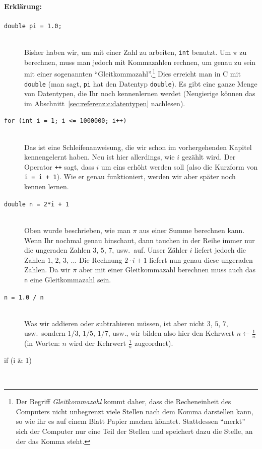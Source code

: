 \paragraph{Erklärung:}

\begin{description}
  \item[\texttt{double pi = 1.0;}] \hfill\\
    Bisher haben wir, um mit einer Zahl zu arbeiten, \texttt{int} benutzt. Um $\pi$ zu berechnen, muss man jedoch mit Kommazahlen rechnen, um genau zu sein mit einer sogenannten ``Gleitkommazahl''.\footnote{%
      Der Begriff \emph{Gleitkommazahl} kommt daher, dass die Recheneinheit des Computers nicht unbegrenzt viele Stellen nach dem Komma darstellen kann, so wie ihr es auf einem Blatt Papier machen könntet. Stattdessen ``merkt'' sich der Computer nur eine Teil der Stellen und speichert dazu die Stelle, an der das Komma steht.}
    Dies erreicht man in C mit \texttt{double} (man sagt, \texttt{pi} hat den Datentyp \texttt{double}). Es gibt eine ganze Menge von Datentypen, die Ihr noch kennenlernen werdet (Neugierige können das im Abschnitt~\ref{sec:referenz:c:datentypen} nachlesen).
  \item[\texttt{for (int i = 1; i <= 1000000; i++)}] \hfill\\
    Das ist eine Schleifenanweisung, die wir schon im vorhergehenden Kapitel kennengelernt haben. Neu ist hier allerdings, wie $i$ gezählt wird. Der Operator \texttt{++} sagt, dass $i$ um eins erhöht werden soll (also die Kurzform von \texttt{i = i + 1}). Wie er genau funktioniert, werden wir aber später noch kennen lernen.
  \item[\texttt{double n = 2*i + 1}] \hfill\\
    Oben wurde beschrieben, wie man $\pi$ aus einer Summe berechnen kann. Wenn Ihr nochmal genau hinschaut, dann tauchen in der Reihe immer nur die ungeraden Zahlen $3$, $5$, $7$, usw.\ auf. Unser Zähler $i$ liefert jedoch die Zahlen $1$, $2$, $3$, ... Die Rechnung $2\cdot i + 1$ liefert nun genau diese ungeraden Zahlen. Da wir $\pi$ aber mit einer Gleitkommazahl berechnen muss auch das \texttt{n} eine Gleitkommazahl sein.
  \item[\texttt{n = 1.0 / n}] \hfill\\
    Was wir addieren oder subtrahieren müssen, ist aber nicht $3$, $5$, $7$, usw.\ sondern $1/3$, $1/5$, $1/7$, usw.,
    wir bilden also hier den Kehrwert $n\leftarrow \frac{1}{n}$ (in Worten: $n$ wird der Kehrwert $\frac{1}{n}$ zugeordnet).
  \item[if (i \& 1)] \hfill\\

\end{description}
